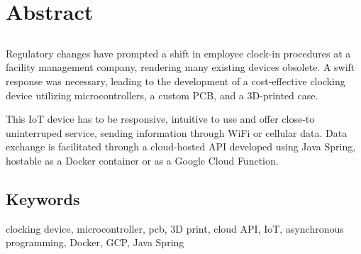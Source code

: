 \chapter*{Abstract}

\section*{\tituloPortadaEngVal}

Regulatory changes have prompted a shift in employee clock-in procedures at a facility management company, rendering many existing 
devices obsolete. A swift response was necessary, leading to the development of a cost-effective clocking device utilizing 
microcontrollers, a custom PCB, and a 3D-printed case.

This IoT device has to be responsive, intuitive to use and offer close-to uninterruped service, sending information through WiFi 
or cellular data. Data exchange is facilitated through a cloud-hosted API developed using Java Spring, hostable as a Docker container
or as a Google Cloud Function.

\section*{Keywords}

\noindent clocking device, microcontroller, pcb, 3D print, cloud API, IoT, asynchronous programming, Docker, GCP, Java Spring



